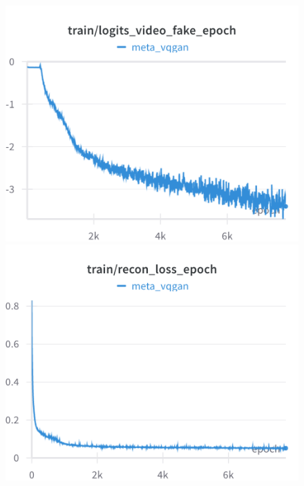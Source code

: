 \begin{figure}[H]
\includegraphics[width=\linewidth]{detailed_engineering/Meta VQGAN/charts/Section-2-Panel-12-0ln7ayozd}
\caption{}
\endminipage\hfill
{}
\includegraphics[width=\linewidth]{detailed_engineering/Meta VQGAN/charts/Section-2-Panel-13-1qhe42yar}
\caption{}
\endminipage
\end{figure}

